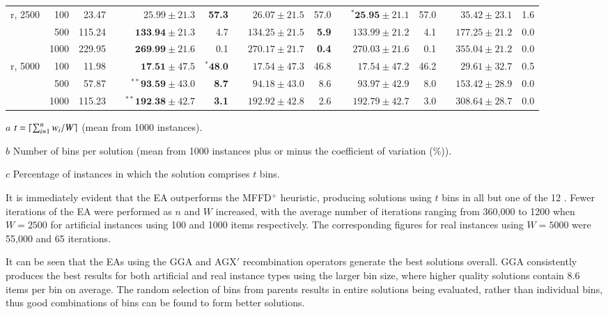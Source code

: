 \documentclass[authoryear]{elsarticle}
\begin{document}
\begin{table}[h!]
\begin{threeparttable}
\begin{tabular}{crrcrrcrrcrrcrr}
	r, 2500 & 100 & 23.47 && $25.99 \pm 21.3$ & \textbf{57.3} && $26.07 \pm 21.5$ & 57.0 && $^{*}\textbf{25.95} \pm 21.1$ & 57.0 && $35.42 \pm 23.1$ & 1.6 \\
	& 500 & 115.24 && $\textbf{133.94} \pm 21.3$ & 4.7 && $134.25 \pm 21.5$ & \textbf{5.9} && $133.99 \pm 21.2$ & 4.1 && $177.25 \pm 21.2$ & 0.0 \\
	& 1000 & 229.95 && $\textbf{269.99} \pm 21.6$ & 0.1 && $270.17 \pm 21.7$ & \textbf{0.4} && $270.03 \pm 21.6$ & 0.1 && $355.04 \pm 21.2$ & 0.0 \\
	\midrule
	r, 5000 & 100 & 11.98 && $\textbf{17.51} \pm 47.5$ & $^{*}\textbf{48.0}$ && $17.54 \pm 47.3$ & 46.8 && $17.54 \pm 47.2$ & 46.2 && $29.61 \pm 32.7$ & 0.5 \\
	& 500 & 57.87 && $^{**}\textbf{93.59} \pm 43.0$ & \textbf{8.7} && $94.18 \pm 43.0$ & 8.6 && $93.97 \pm 42.9$ & 8.0 && $153.42 \pm 28.9$ & 0.0 \\
	& 1000 & 115.23 && $^{**}\textbf{192.38} \pm 42.7$ & \textbf{3.1} && $192.92 \pm 42.8$ & 2.6 && $192.79 \pm 42.7$ & 3.0 && $308.64 \pm 28.7$ & 0.0 \\
	\bottomrule
\end{tabular}	
\vspace{0.2cm} %
\begin{tablenotes}
	\scriptsize
	\item[$a$] $t = \lceil\sum_{i=1}^{n} w_i / W\rceil$ (mean from 1000 instances).
	\item[$b$] Number of bins per solution (mean from 1000 instances plus or minus the coefficient of variation (\%)).
	\item[$c$] Percentage of instances in which the solution comprises $t$ bins.
\end{tablenotes}
\end{threeparttable}
\label{table:ea}
\end{table}

\noindent It is immediately evident that the EA outperforms the MFFD$^+$ heuristic, producing solutions using $t$ bins in all but one of the 12 . Fewer iterations of the EA were performed as $n$ and $W$ increased, with the average number of iterations ranging from 360,000 to 1200 when $W=2500$ for artificial instances using 100 and 1000 items respectively. The corresponding figures for real instances using $W=5000$ were 55,000 and 65 iterations.

It can be seen that the EAs using the GGA and AGX$'$ recombination operators generate the best solutions overall. GGA consistently produces the best results for both artificial and real instance types using the larger bin size, where higher quality solutions contain 8.6 items per bin on average. The random selection of bins from parents results in entire solutions being evaluated, rather than individual bins, thus good combinations of bins can be found to form better solutions.
\end{document}
